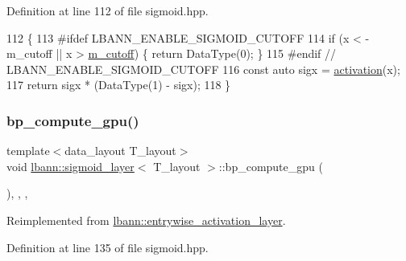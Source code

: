 Definition at line 112 of file sigmoid.\+hpp.


\begin{DoxyCode}
112                                                             \{
113 \textcolor{preprocessor}{  #ifdef LBANN\_ENABLE\_SIGMOID\_CUTOFF}
114     \textcolor{keywordflow}{if} (x < -m\_cutoff || x > \hyperlink{classlbann_1_1sigmoid__layer_ab4a50a9ae123aef61ff3f0c9c066bdff}{m\_cutoff}) \{ \textcolor{keywordflow}{return} DataType(0); \}
115 \textcolor{preprocessor}{  #endif // LBANN\_ENABLE\_SIGMOID\_CUTOFF}
116     \textcolor{keyword}{const} \textcolor{keyword}{auto} sigx = \hyperlink{classlbann_1_1sigmoid__layer_ab6a237e0a10be2599474dcd2cd73e767}{activation}(x);
117     \textcolor{keywordflow}{return} sigx * (DataType(1) - sigx);
118   \}
\end{DoxyCode}
\mbox{\label{classlbann_1_1sigmoid__layer_a30a9ff1cd4ec6d4ef4e60859a10b5936}} 
\subsubsection{\texorpdfstring{bp\+\_\+compute\+\_\+gpu()}{bp\_compute\_gpu()}}
{\footnotesize\ttfamily template$<$data\+\_\+layout T\+\_\+layout$>$ \\
void \hyperlink{classlbann_1_1sigmoid__layer}{lbann\+::sigmoid\+\_\+layer}$<$ T\+\_\+layout $>$\+::bp\+\_\+compute\+\_\+gpu (\begin{DoxyParamCaption}{ }\end{DoxyParamCaption})\hspace{0.3cm}{\ttfamily [inline]}, {\ttfamily [override]}, {\ttfamily [protected]}, {\ttfamily [virtual]}}



Reimplemented from \hyperlink{classlbann_1_1entrywise__activation__layer_a569674cb4c0f50ea76acc0733fc53ba9}{lbann\+::entrywise\+\_\+activation\+\_\+layer}.



Definition at line 135 of file sigmoid.\+hpp.


